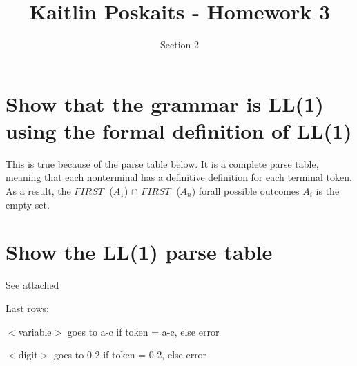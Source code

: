 \documentclass[11pt]{article}
\title{\bf Kaitlin Poskaits - Homework 3}
\author{Section 2}
\date{}
\begin{document}
\maketitle

\section{Show that the grammar is LL(1) using the formal definition of LL(1)}
This is true because of the parse table below. It is a complete parse table,
meaning that each nonterminal has a definitive definition for each terminal
token. As a result, the $FIRST^{+}$($A_{1}$) $\cap$ $FIRST^{+}$($A_{n}$)
forall possible outcomes $A_{i}$ is the empty set.

\section{Show the LL(1) parse table}
See attached

Last rows:
	
	\indent $<$variable$>$ goes to a-c if token = a-c, else error
	
	\indent $<$digit$>$ goes to 0-2 if token = 0-2, else error
\end{document}
